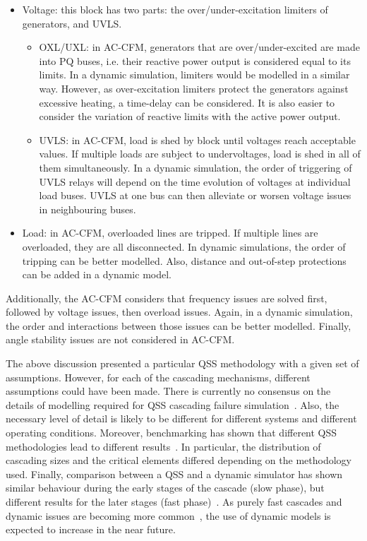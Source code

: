 \begin{itemize}
    \item Voltage: this block has two parts: the over/under-excitation limiters of generators, and UVLS.
    \begin{itemize}
        \item OXL/UXL: in AC-CFM, generators that are over/under-excited are made into PQ buses, i.e. their reactive power output is considered equal to its limits. In a dynamic simulation, limiters would be modelled in a similar way. However, as over-excitation limiters protect the generators against excessive heating, a time-delay can be considered. It is also easier to consider the variation of reactive limits with the active power output.
        \item UVLS: in AC-CFM, load is shed by block until voltages reach acceptable values. If multiple loads are subject to undervoltages, load is shed in all of them simultaneously. In a dynamic simulation, the order of triggering of UVLS relays will depend on the time evolution of voltages at individual load buses. UVLS at one bus can then alleviate or worsen voltage issues in neighbouring buses.
    \end{itemize}
    \item Load: in AC-CFM, overloaded lines are tripped. If multiple lines are overloaded, they are all disconnected. In dynamic simulations, the order of tripping can be better modelled. Also, distance and out-of-step protections can be added in a dynamic model.
\end{itemize}

Additionally, the AC-CFM considers that frequency issues are solved first, followed by voltage issues, then overload issues. Again, in a dynamic simulation, the order and interactions between those issues can be better modelled. Finally, angle stability issues are not considered in AC-CFM.

The above discussion presented a particular QSS methodology with a given set of assumptions. However, for each of the cascading mechanisms, different assumptions could have been made. There is currently no consensus on the details of modelling required for QSS cascading failure simulation~\cite{Benchmarking2018, BenefitsAndChallengesDynamicPreece}. Also, the necessary level of detail is likely to be different for different systems and different operating conditions. Moreover, benchmarking has shown that different QSS methodologies lead to different results~\cite{Benchmarking2018}. In particular, the distribution of cascading sizes and the critical elements differed depending on the methodology used. Finally, comparison between a QSS and a dynamic simulator has shown similar behaviour during the early stages of the cascade (slow phase), but different results for the later stages (fast phase)~\cite{BenchmarkingStaticVsDynamic}. As purely fast cascades and dynamic issues are becoming more common~\cite{cascadeAcceleration}, the use of dynamic models is expected to increase in the near future.


